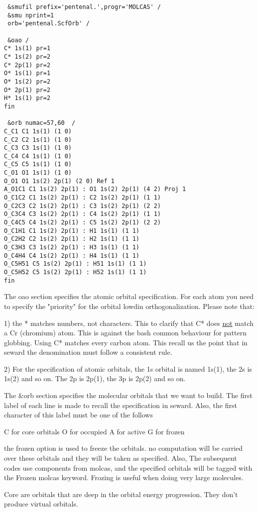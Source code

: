 \documentclass[11pt,a4paper]{article}
\begin{document}
\begin{verbatim}
 &smufil prefix='pentenal.',progr='MOLCAS' /
 &smu nprint=1
 orb='pentenal.ScfOrb' /

 &oao /
C* 1s(1) pr=1
C* 1s(2) pr=2
C* 2p(1) pr=2
O* 1s(1) pr=1
O* 1s(2) pr=2
O* 2p(1) pr=2
H* 1s(1) pr=2
fin

 &orb numac=57,60  /
C_C1 C1 1s(1) (1 0)
C_C2 C2 1s(1) (1 0)
C_C3 C3 1s(1) (1 0)
C_C4 C4 1s(1) (1 0)
C_C5 C5 1s(1) (1 0)
C_O1 O1 1s(1) (1 0)
O_O1 O1 1s(2) 2p(1) (2 0) Ref 1
A_O1C1 C1 1s(2) 2p(1) : O1 1s(2) 2p(1) (4 2) Proj 1
O_C1C2 C1 1s(2) 2p(1) : C2 1s(2) 2p(1) (1 1)
O_C2C3 C2 1s(2) 2p(1) : C3 1s(2) 2p(1) (2 2)
O_C3C4 C3 1s(2) 2p(1) : C4 1s(2) 2p(1) (1 1)
O_C4C5 C4 1s(2) 2p(1) : C5 1s(2) 2p(1) (2 2)
O_C1H1 C1 1s(2) 2p(1) : H1 1s(1) (1 1)
O_C2H2 C2 1s(2) 2p(1) : H2 1s(1) (1 1)
O_C3H3 C3 1s(2) 2p(1) : H3 1s(1) (1 1)
O_C4H4 C4 1s(2) 2p(1) : H4 1s(1) (1 1)
O_C5H51 C5 1s(2) 2p(1) : H51 1s(1) (1 1)
O_C5H52 C5 1s(2) 2p(1) : H52 1s(1) (1 1)
fin
\end{verbatim}

The oao section specifies the atomic orbital specification. For each atom you
need to specify the "priority" for the orbital lowdin orthogonalization. Please
note that:

1) the * matches numbers, not characters. This to clarify that C* does
\underline{not} match a Cr (chromium) atom.  This is against the bash common
behaviour for pattern globbing. Using C* matches every carbon atom. This
recall us the point that in seward the denomination must follow a consistent
rule.

2) For the specification of atomic orbitals, the 1s orbital is named 1s(1), the
2s is 1s(2) and so on.  The 2p is 2p(1), the 3p is 2p(2) and so on.

The \&orb section specifies the molecular orbitals that we want to build. The
first label of each line is made to recall the specification in seward. Also,
the first character of this label must be one of the follows

C for core orbitals
O for occupied
A for active
G for frozen

the frozen option is used to freeze the orbitals. no computation will be carried
over these orbitals and they will be taken as specified. Also, The subsequent
codes use components from molcas, and the specified orbitals will be tagged
with the Frozen molcas keyword. Frozing is useful when doing very large
molecules.

Core are orbitals that are deep in the orbital energy progression. They don't
produce virtual orbitals.
\end{document}
